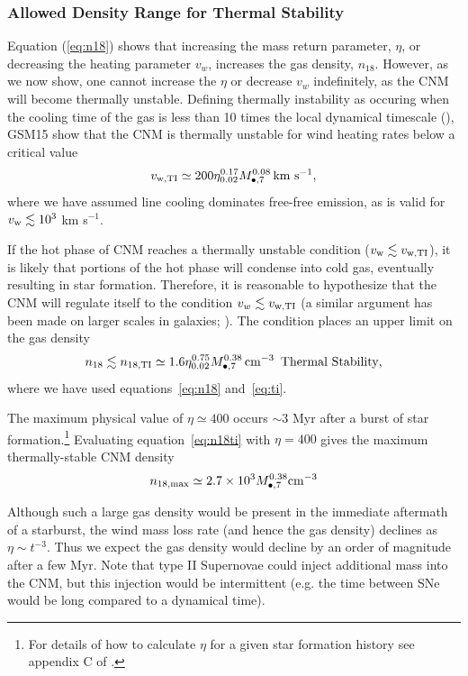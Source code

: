 \documentclass[usenatbib,fleqn]{mnras}
\newcommand{\Mbh}[1][]{M_{\bullet#1}}
\begin{document}
\subsubsection{Allowed Density Range for Thermal Stability}

Equation (\ref{eq:n18}) shows that increasing the mass return
parameter, $\eta$, or decreasing the heating parameter $v_w$,
increases the gas density, $n_{18}$.  However, as we now show, one
cannot increase the $\eta$ or decrease $v_w$ indefinitely, as the CNM
will become thermally unstable.  Defining thermally instability as
occuring when the cooling time of the gas is less than 10 times the
local dynamical timescale (\citealt{McCourt+2012}), GSM15 show that the
CNM is thermally unstable for wind heating rates below a critical
value
\begin{equation}
v_{\rm w,TI}\simeq 200 \eta_{0.02}^{0.17} \Mbh[,7]^{0.08} \,{\rm km \,\,s^{-1}},
\label{eq:ti}
\end{equation}
where we have assumed line cooling dominates free-free emission, as is valid for $v_{\rm w} \lesssim 10^{3}$ km s$^{-1}$.

If the hot phase of CNM reaches a thermally unstable condition
($v_{\rm w} \lesssim v_{\rm w,TI}$), it is likely that portions of the
hot phase will condense into cold gas, eventually resulting in star
formation.  Therefore, it is reasonable to hypothesize that the CNM
will regulate itself to the condition $v_w \lesssim v_{\rm w,TI}$ (a
similar argument has been made on larger scales in galaxies;
\citealt{Voit+2015}).  The condition places an upper limit on the gas
density
\begin{equation}
n_{18} \lesssim n_{\rm 18,TI}\simeq 1.6 \eta_{0.02}^{0.75} \Mbh[,7]^{0.38} \, {\rm cm^{-3}}\,\,\,\text{Thermal Stability}
\label{eq:n18ti},
\end{equation}
where we have used equations~\eqref{eq:n18} and~\eqref{eq:ti}.

The maximum physical value of $\eta\simeq 400$ occurs $\sim 3$ Myr after a burst of star formation.\footnote{For details
  of how to calculate $\eta$ for a given star formation history see
  appendix C of \citet{Generozov+2015}.}  Evaluating equation~\eqref{eq:n18ti} with
$\eta=400$ gives the maximum thermally-stable CNM density
\begin{equation}
n_{\rm 18,max} \simeq 2.7\times 10^{3} \Mbh[,7]^{0.38} {\rm cm^{-3}}
\label{eq:n18max}
\end{equation}

Although such a large gas density would be present in the immediate
aftermath of a starburst, the wind mass loss rate (and hence the gas
density) declines as $\eta \sim t^{-3}$. Thus we expect the gas
density would decline by an order of magnitude after a few Myr. Note
that type II Supernovae could inject additional mass into the CNM, but
this injection would be intermittent (e.g. the time between SNe would
be long compared to a dynamical time).
\end{document}
